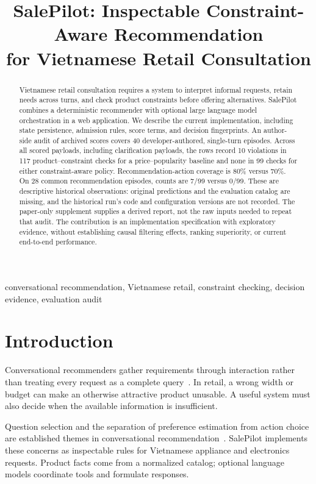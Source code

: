 \documentclass[conference,a4paper]{IEEEtran}
\title{SalePilot: Inspectable Constraint-Aware Recommendation\\for Vietnamese Retail Consultation}
\author{}
\begin{document}
\maketitle

\begin{abstract}
Vietnamese retail consultation requires a system to interpret informal requests, retain needs across turns, and check product constraints before offering alternatives. SalePilot combines a deterministic recommender with optional large language model orchestration in a web application. We describe the current implementation, including state persistence, admission rules, score terms, and decision fingerprints. An author-side audit of archived scores covers 40 developer-authored, single-turn episodes. Across all scored payloads, including clarification payloads, the rows record 10 violations in 117 product--constraint checks for a price--popularity baseline and none in 99 checks for either constraint-aware policy. Recommendation-action coverage is 80\% versus 70\%. On 28 common recommendation episodes, counts are 7/99 versus 0/99. These are descriptive historical observations: original predictions and the evaluation catalog are missing, and the historical run's code and configuration versions are not recorded. The paper-only supplement supplies a derived report, not the raw inputs needed to repeat that audit. The contribution is an implementation specification with exploratory evidence, without establishing causal filtering effects, ranking superiority, or current end-to-end performance.
\end{abstract}
\begin{IEEEkeywords}
conversational recommendation, Vietnamese retail, constraint checking, decision evidence, evaluation audit
\end{IEEEkeywords}

\section{Introduction}
Conversational recommenders gather requirements through interaction rather than treating every request as a complete query~\cite{jannach2021survey}. In retail, a wrong width or budget can make an otherwise attractive product unusable. A useful system must also decide when the available information is insufficient.

Question selection and the separation of preference estimation from action choice are established themes in conversational recommendation~\cite{christakopoulou2016towards,lei2020ear}. SalePilot implements these concerns as inspectable rules for Vietnamese appliance and electronics requests. Product facts come from a normalized catalog; optional language models coordinate tools and formulate responses.
\end{document}
